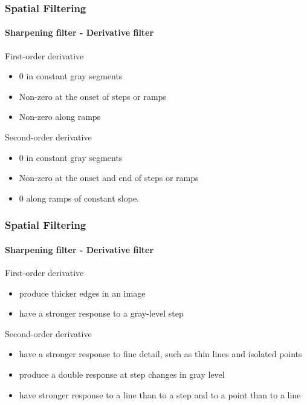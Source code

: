 \documentclass[table]{beamer}
\begin{document}
\begin{frame}
  \frametitle{Spatial Filtering}
  \framesubtitle{Sharpening filter - Derivative filter}
  \begin{block}{First-order derivative}
    \begin{itemize}
    \item 0 in constant gray segments
    \item Non-zero at the onset of steps or ramps
    \item Non-zero along ramps
    \end{itemize}

  \end{block}
  \begin{block}{Second-order derivative}
    \begin{itemize}
    \item 0 in constant gray segments
    \item Non-zero at the onset and end of steps or ramps
    \item 0 along ramps of constant slope.
    \end{itemize}

  \end{block}
\end{frame}
\begin{frame}
\frametitle{Spatial Filtering}
\framesubtitle{Sharpening filter - Derivative filter}
  \begin{block}{First-order derivative}
    \begin{itemize}
    \item produce thicker edges in an image
    \item have a stronger response to a gray-level step
    \end{itemize}
  \end{block}
  \begin{block}{Second-order derivative}
    \begin{itemize}
    \item have a stronger response to fine detail, such as thin lines and isolated points
    \item produce a double response at step changes in gray level
    \item have stronger response to a line than to a step and to a point than to a line
    \end{itemize}
  \end{block}
\end{frame}
\end{document}
